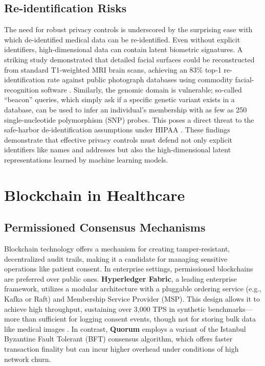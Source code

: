 \documentclass[12pt]{report}
\begin{document}
\subsection{Re-identification Risks}
The need for robust privacy controls is underscored by the surprising ease with which de-identified medical data can be re-identified. Even without explicit identifiers, high-dimensional data can contain latent biometric signatures. A striking study demonstrated that detailed facial surfaces could be reconstructed from standard T1-weighted MRI brain scans, achieving an 83\% top-1 re-identification rate against public photograph databases using commodity facial-recognition software \cite{Schwarz2019MRI}. Similarly, the genomic domain is vulnerable; so-called “beacon” queries, which simply ask if a specific genetic variant exists in a database, can be used to infer an individual's membership with as few as 250 single-nucleotide polymorphism (SNP) probes. This poses a direct threat to the safe-harbor de-identification assumptions under HIPAA \cite{Shringarpure2015Beacon}. These findings demonstrate that effective privacy controls must defend not only explicit identifiers like names and addresses but also the high-dimensional latent representations learned by machine learning models.

\section{Blockchain in Healthcare}\label{sec:blockchain}

\subsection{Permissioned Consensus Mechanisms}
Blockchain technology offers a mechanism for creating tamper-resistant, decentralized audit trails, making it a candidate for managing sensitive operations like patient consent. In enterprise settings, permissioned blockchains are preferred over public ones. \textbf{Hyperledger Fabric}, a leading enterprise framework, utilizes a modular architecture with a pluggable ordering service (e.g., Kafka or Raft) and Membership Service Provider (MSP). This design allows it to achieve high throughput, sustaining over 3,000 TPS in synthetic benchmarks—more than sufficient for logging consent events, though not for storing bulk data like medical images \cite{Androulaki2018Fabric}. In contrast, \textbf{Quorum} employs a variant of the Istanbul Byzantine Fault Tolerant (BFT) consensus algorithm, which offers faster transaction finality but can incur higher overhead under conditions of high network churn.
\end{document}
